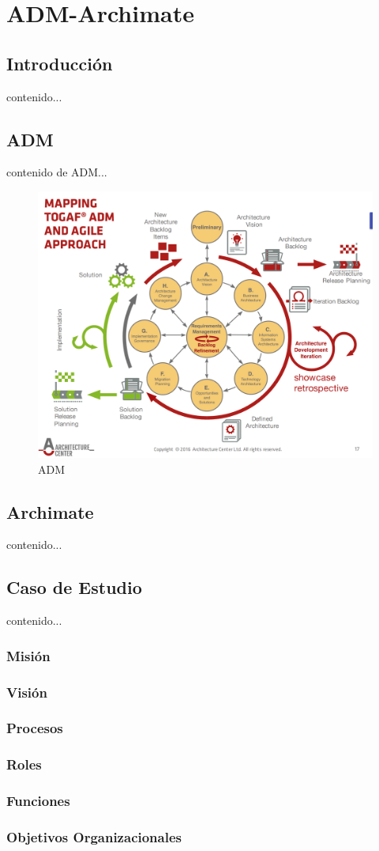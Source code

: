 \chapter{ADM-Archimate}
\section{Introducción}
contenido...
\newpage

\section{ADM}
contenido de ADM...

\begin{figure}[h!]
	\centering
	\includegraphics[width=0.7\linewidth]{ARQUITECTURA/imgs/adm}
	\caption{ADM \cite{SB,1579133,6337726,6337730,6827125}}
\end{figure}


\newpage

\section{Archimate}
contenido...

\newpage

\section{Caso de Estudio}
contenido...

\subsection{Misión}

\subsection{Visión}

\subsection{Procesos}

\subsection{Roles}

\subsection{Funciones}

\subsection{Objetivos Organizacionales}

\newpage